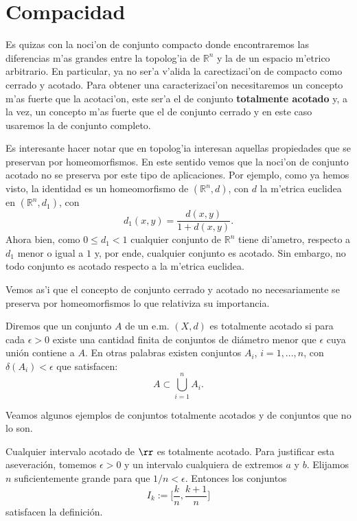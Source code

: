 \section{Compacidad}

Es quizas con la noci'on de conjunto compacto donde encontraremos
las diferencias m'as grandes entre la topolog'ia de $\mathbb{R}^n$
y la de un espacio m'etrico arbitrario. En particular, ya no ser'a
v'alida la carectizaci'on de compacto como cerrado y acotado. Para
obtener una caracterizaci'on necesitaremos un concepto m'as fuerte
que la acotaci'on, este ser'a el de conjunto \textbf{totalmente
acotado} y, a la vez, un concepto m'as fuerte que el de conjunto
cerrado y en este caso usaremos la de conjunto completo.

Es interesante hacer notar que en topolog'ia interesan aquellas
propiedades que se preservan por homeomorfismos. En este sentido
vemos que la noci'on de conjunto acotado no se preserva por este
tipo de aplicaciones. Por ejemplo, como ya hemos visto, la
identidad es un homeomorfismo de $(\mathbb{R}^n,d)$, con $d$ la
m'etrica euclidea en $(\mathbb{R}^n,d_1)$, con
\[
    d_1(x,y)=\frac{d(x,y)}{1+d(x,y)}.
\]
Ahora bien, como $0\leq d_1<1$ cualquier conjunto de
$\mathbb{R}^n$ tiene di'ametro, respecto a $d_1$ menor o igual a
$1$ y, por ende, cualquier conjunto es acotado. Sin embargo, no
todo conjunto es acotado respecto a la m'etrica euclidea.

Vemos as'i que el concepto de conjunto cerrado y acotado no
necesariamente se preserva por homeomorfismos lo que relativiza su
importancia.



\begin{definicion}  Diremos que un conjunto $A$ de un e.m. $(X,d)$ es totalmente acotado
si para cada $\epsilon>0$ existe una cantidad finita de conjuntos
de di\'ametro menor que $\epsilon$ cuya uni\'on contiene a  $A$.
En otras palabras existen conjuntos $A_i$, $i=1,...,n$, con
$\delta(A_i)<\epsilon$ que satisfacen:
\[
    A\subset \bigcup\limits_{i=1}^nA_i.
\]
\end{definicion}

Veamos algunos ejemplos de conjuntos totalmente acotados y de
conjuntos que no lo son.

\begin{ejemplo} Cualquier intervalo acotado de $\rr$ es
totalmente acotado. Para justificar esta aseveraci\'on, tomemos
$\epsilon>0$ y un intervalo cualquiera de extremos $a$ y $b$.
Elijamos $n$ suficientemente grande para que $1/n<\epsilon$.
Entonces los conjuntos
\[
    I_k:=\bigl[\frac{k}{n},\frac{k+1}{n}\bigr]
\]
satisfacen la definici\'on.
\end{ejemplo}

